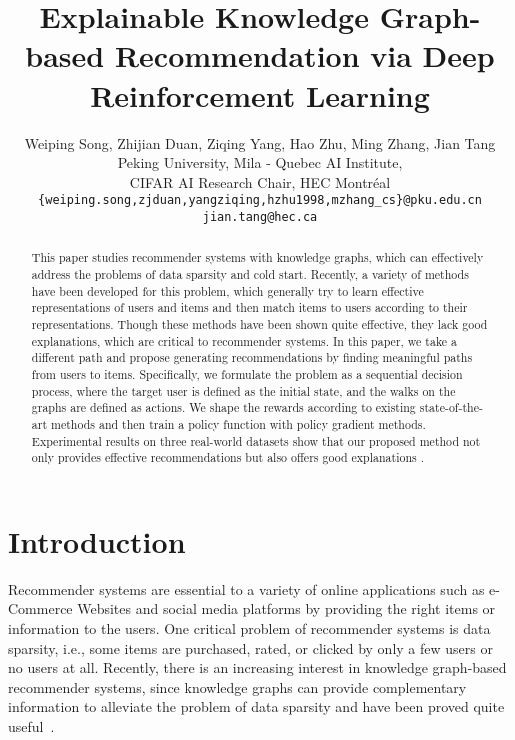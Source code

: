 \documentclass{article}
\title{Explainable Knowledge Graph-based Recommendation via Deep Reinforcement Learning}
\author{Weiping Song, Zhijian Duan, Ziqing Yang, Hao Zhu, Ming Zhang, Jian Tang \\
Peking University, Mila - Quebec AI Institute, \\
CIFAR AI Research Chair, HEC Montréal \\
{\small \texttt{\{weiping.song,zjduan,yangziqing,hzhu1998,mzhang\_cs\}@pku.edu.cn}} \\
{\small \texttt{jian.tang@hec.ca}}
}
\begin{document}
\maketitle

\renewcommand{\thefootnote}{\fnsymbol{footnote}}
\renewcommand{\thefootnote}{\arabic{footnote}}


\begin{abstract}


This paper studies recommender systems with knowledge graphs, which can effectively address the problems of data sparsity and cold start. Recently, a variety of methods have been developed for this problem, which generally try to learn effective representations of users and items and then match items to users according to their representations. Though these methods have been shown quite effective, they lack good explanations, which are critical to recommender systems. In this paper, we take a different path and propose generating recommendations by finding meaningful paths from users to items.
Specifically, we formulate the problem as a sequential decision process, where the target user is defined as the initial state, and the walks on the graphs are defined as actions. We shape the rewards according to existing state-of-the-art methods and then train a policy function with policy gradient methods.
Experimental results on three real-world datasets show that our proposed method not only provides effective recommendations but also offers good explanations
.  



\end{abstract}

\section{Introduction}




Recommender systems are essential to a variety of online applications such as e-Commerce Websites and social media platforms by providing the right items or information to the users. One critical problem of recommender systems is data sparsity, i.e., some items are purchased, rated, or clicked by only a few users or no users at all. Recently, there is an increasing interest in knowledge graph-based recommender systems, since knowledge graphs can provide complementary information to alleviate the problem of data sparsity and have been proved quite useful~\cite{Cao_2019,Ma_2019,wang2018ripplenet,wang2018dkn,zhang2016collaborative,zhang2018explainable}. 
\end{document}
